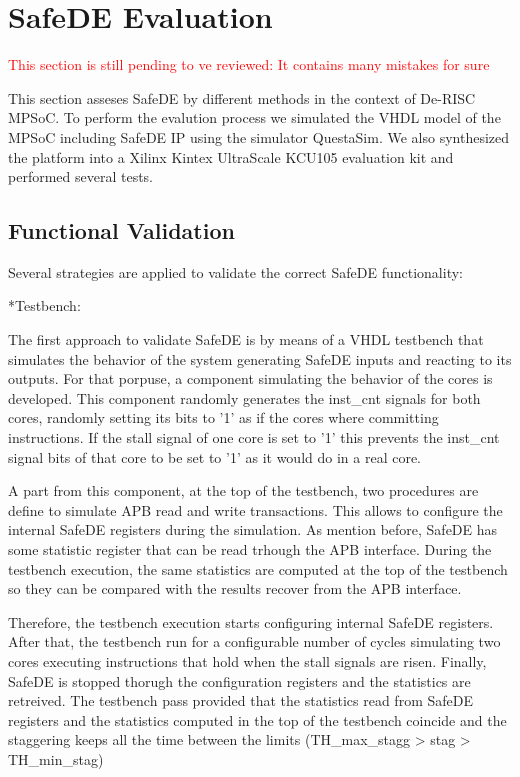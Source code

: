 \clearpage\section{SafeDE Evaluation}

\textcolor{red}{This section is still pending to ve reviewed: It contains many mistakes for sure}

This section asseses SafeDE by different methods in the context of De-RISC MPSoC. To perform the evalution process we simulated the VHDL model of the MPSoC including SafeDE IP using the simulator QuestaSim. We also synthesized the platform into a Xilinx Kintex UltraScale KCU105 evaluation kit and performed several tests. 

\subsection{Functional Validation}

Several strategies are applied to validate the correct SafeDE functionality:

*Testbench: 

The first approach to validate SafeDE is by means of a VHDL testbench that simulates the behavior of the system generating SafeDE inputs and reacting to its outputs. For that porpuse, a component simulating the behavior of the cores is developed. This component randomly generates the inst\_cnt signals for both cores, randomly setting its bits to '1' as if the cores where committing instructions. If the stall signal of one core is set to '1' this prevents the inst\_cnt signal bits of that core to be set to '1' as it would do in a real core. 

A part from this component, at the top of the testbench, two procedures are define to simulate APB read and write transactions. This allows to configure the internal SafeDE registers during the simulation. As mention before, SafeDE has some statistic register that can be read trhough the APB interface. During the testbench execution, the same statistics are computed at the top of the testbench so they can be compared with the results recover from the APB interface. 

Therefore, the testbench execution starts configuring internal SafeDE registers. After that, the testbench run for a configurable number of cycles simulating two cores executing instructions that hold when the stall signals are risen. Finally, SafeDE is stopped thorugh the configuration registers and the statistics are retreived. The testbench pass provided that the statistics read from SafeDE registers and the statistics computed in the top of the testbench coincide and the staggering keeps all the time between the limits (TH\_max\_stagg > stag > TH\_min\_stag)

